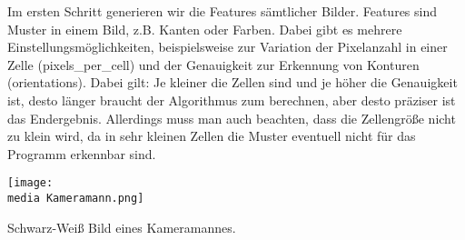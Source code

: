 %
%
%
%
Im ersten Schritt generieren wir die Features sämtlicher Bilder. Features sind Muster in einem Bild, z.B. Kanten oder Farben. Dabei gibt es mehrere Einstellungsmöglichkeiten, beispielsweise zur Variation der Pixelanzahl in einer Zelle (pixels\_per\_cell) und der Genauigkeit zur Erkennung von Konturen (orientations). Dabei gilt: Je kleiner die Zellen sind und je höher die Genauigkeit ist, desto länger braucht der Algorithmus zum berechnen, aber desto präziser ist das Endergebnis. Allerdings muss man auch beachten, dass die Zellengröße nicht zu klein wird, da in sehr kleinen Zellen die Muster eventuell nicht für das Programm erkennbar sind. 

\begin{dsafigure}
\begin{center}
	\texttt{[image: \\media Kameramann.png]}
	\caption{Schwarz-Weiß Bild eines Kameramannes.}
	\label{Kameramann}
\end{center}
\end{dsafigure}

